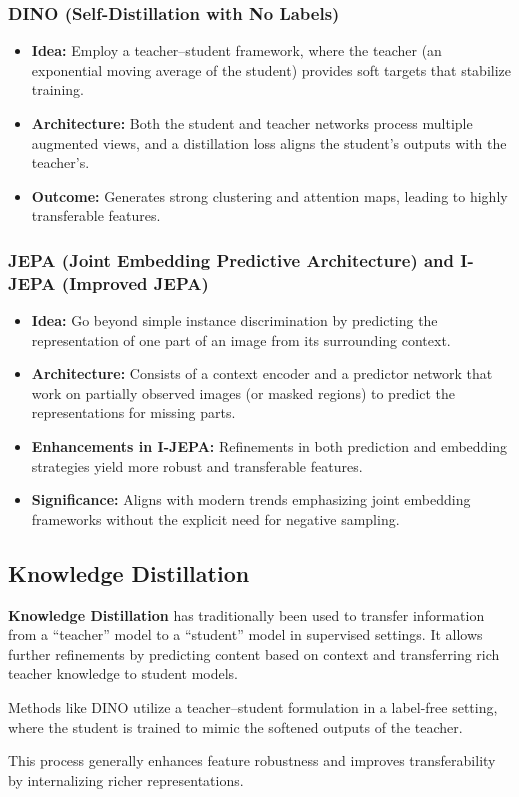 \documentclass{article}
\begin{document}
\subsubsection{DINO (Self-Distillation with No Labels)}
\begin{itemize}
    \item \textbf{Idea:} Employ a teacher--student framework, where the teacher (an exponential moving average of the student) provides soft targets that stabilize training.
    \item \textbf{Architecture:} Both the student and teacher networks process multiple augmented views, and a distillation loss aligns the student’s outputs with the teacher’s.
    \item \textbf{Outcome:} Generates strong clustering and attention maps, leading to highly transferable features.
\end{itemize}

\subsubsection{JEPA (Joint Embedding Predictive Architecture) and I-JEPA (Improved JEPA)}
\begin{itemize}
    \item \textbf{Idea:} Go beyond simple instance discrimination by predicting the representation of one part of an image from its surrounding context.
    \item \textbf{Architecture:} Consists of a context encoder and a predictor network that work on partially observed images (or masked regions) to predict the representations for missing parts.
    \item \textbf{Enhancements in I-JEPA:} Refinements in both prediction and embedding strategies yield more robust and transferable features.
    \item \textbf{Significance:} Aligns with modern trends emphasizing joint embedding frameworks without the explicit need for negative sampling.
\end{itemize}

\subsection{Knowledge Distillation}

\textbf{Knowledge Distillation} has traditionally been used to transfer information from a “teacher” model to a “student” model in supervised settings. It allows further refinements by predicting content based on context and transferring rich teacher knowledge to student models.

Methods like DINO utilize a teacher--student formulation in a label-free setting, where the student is trained to mimic the softened outputs of the teacher.

This process generally enhances feature robustness and improves transferability by internalizing richer representations.
\end{document}
